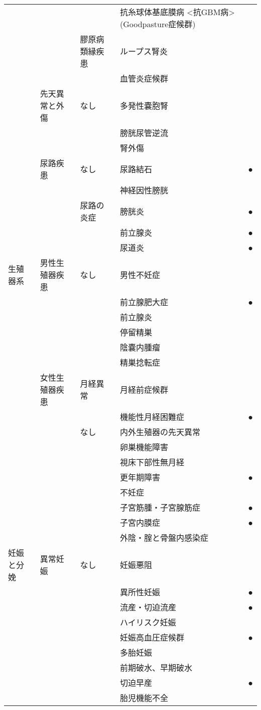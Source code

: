 \begin{xltabular}{\linewidth}{XXXXX}
 &  &  & 抗糸球体基底膜病 <抗GBM病> (Goodpasture症候群) &  \\
 &  & 膠原病類縁疾患 & ループス腎炎 &  \\
 &  &  & 血管炎症候群 &  \\
 & 先天異常と外傷 & なし & 多発性嚢胞腎 &  \\
 &  &  & 膀胱尿管逆流 &  \\
 &  &  & 腎外傷 &  \\
 & 尿路疾患 & なし & 尿路結石 & ● \\
 &  &  & 神経因性膀胱 &  \\
 &  & 尿路の炎症 & 膀胱炎 & ● \\
 &  &  & 前立腺炎 & ● \\
 &  &  & 尿道炎 & ● \\
生殖器系 & 男性生殖器疾患 & なし & 男性不妊症 &  \\
 &  &  & 前立腺肥大症 & ● \\
 &  &  & 前立腺炎 &  \\
 &  &  & 停留精巣 &  \\
 &  &  & 陰嚢内腫瘤 &  \\
 &  &  & 精巣捻転症 &  \\
 & 女性生殖器疾患 & 月経異常 & 月経前症候群 &  \\
 &  &  & 機能性月経困難症 & ● \\
 &  & なし & 内外生殖器の先天異常 &  \\
 &  &  & 卵巣機能障害 &  \\
 &  &  & 視床下部性無月経 &  \\
 &  &  & 更年期障害 & ● \\
 &  &  & 不妊症 &  \\
 &  &  & 子宮筋腫・子宮腺筋症 & ● \\
 &  &  & 子宮内膜症 & ● \\
 &  &  & 外陰・腟と骨盤内感染症 &  \\
妊娠と分娩 & 異常妊娠 & なし & 妊娠悪阻 &  \\
 &  &  & 異所性妊娠 & ● \\
 &  &  & 流産・切迫流産 & ● \\
 &  &  & ハイリスク妊娠 &  \\
 &  &  & 妊娠高血圧症候群 & ● \\
 &  &  & 多胎妊娠 &  \\
 &  &  & 前期破水、早期破水 &  \\
 &  &  & 切迫早産 & ● \\
 &  &  & 胎児機能不全 &  \\

\end{xltabular}
